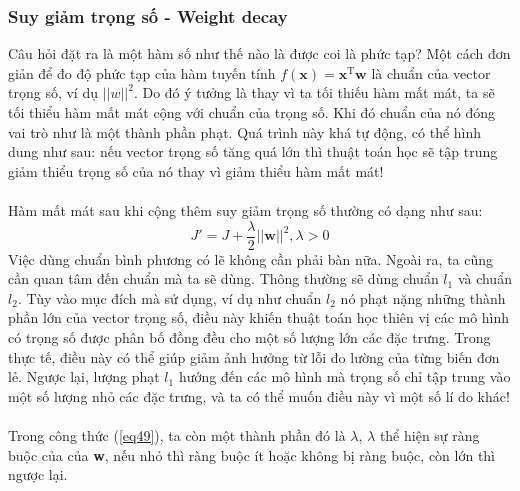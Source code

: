 \documentclass{article}
\begin{document}
 \subsubsection{Suy giảm trọng số - Weight decay}
 Câu hỏi đặt ra là một hàm số như thế nào là được coi là phức tạp? Một cách đơn giản để đo độ phức tạp của hàm tuyến tính $f(\textbf{x}) = \textbf{x}^{\text{T}}\textbf{w}$ là chuẩn của vector trọng số, ví dụ $||w||^2$. Do đó ý tưởng là thay vì ta tối thiếu hàm mất mát, ta sẽ tối thiểu hàm mất mát cộng với chuẩn của trọng số. Khi đó chuẩn của nó đóng vai trò như là một thành phần phạt. Quá trình này khá tự động, có thể hình dung như sau: nếu vector trọng số tăng quá lớn thì thuật toán học sẽ tập trung giảm thiểu trọng số của nó thay vì giảm thiểu hàm mất mát!\\\\
 Hàm mất mát sau khi cộng thêm suy giảm trọng số thường có dạng như sau:
 \begin{equation}
     J' = J+\frac{\lambda}{2}||\textbf{w}||^{2}, \lambda>0
     \label{eq49}
 \end{equation}
 Việc dùng chuẩn bình phương có lẽ không cần phải bàn nữa. Ngoài ra, ta cũng cần quan tâm đến chuẩn mà ta sẽ dùng. Thông thường sẽ dùng chuẩn $l_1$ và chuẩn $l_2$. Tùy vào mục đích mà sử dụng, ví dụ như chuẩn $l_2$ nó phạt nặng những thành phần lớn của vector trọng số, điều này khiến thuật toán học thiên vị các mô hình có trọng số được phân bố đồng đều cho một số lượng lớn các đặc trưng. Trong thực tế, điều này có thể giúp giảm ảnh hưởng từ lỗi đo lường của từng biến đơn lẻ. Ngược lại, lượng phạt $l_1$ hướng đến các mô hình mà trọng số chỉ tập trung vào một số lượng nhỏ các đặc trưng, và ta có thể muốn điều này vì một số lí do khác!\\\\
 Trong công thức (\ref{eq49}), ta còn một thành phần đó là $\lambda$, $\lambda$ thể hiện sự ràng buộc của của \textbf{w}, nếu nhỏ thì ràng buộc ít hoặc không bị ràng buộc, còn lớn thì ngược lại. 
\end{document}
